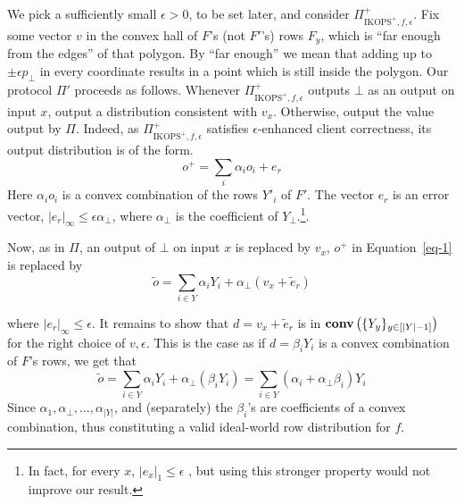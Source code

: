 \documentclass{llncs}
\newcommand{\CH}[1]{\normalfont{\mathbf{conv}\of{#1}}}
\begin{document}
{We pick a sufficiently small $\epsilon>0$, to be set later, and consider $\Pi^+_{\text{IKOPS}^+,f,\epsilon}$. Fix some vector $v$ in the convex hall of $F$'s (not $F'$'s) rows $F_y$, which is ``far enough from the edges'' of that polygon.
By ``far enough'' we mean that adding up to $\pm\epsilon p_\bot$ in every coordinate
results in a point which is still inside the polygon.
Our protocol $\Pi'$ proceeds as follows. Whenever $\Pi^+_{\text{IKOPS}^+,f,\epsilon}$ outputs $\bot$ as an output on input $x$, output  a distribution consistent with $v_x$. Otherwise, output the value output by $\Pi$. 
Indeed, as $\Pi^+_{\text{IKOPS}^+,f,\epsilon}$ satisfies $\epsilon$-enhanced client correctness, its output distribution 
is of the form.
\begin{equation}\label{eq-1}
o^+ = \sum_i\alpha_i o_i + e_r
\end{equation}
Here $\alpha_i o_i$ is a convex combination of the rows $Y'_i$ of $F'$.
The vector $e_r$ is an error vector, $|e_r|_\infty\leq \epsilon\alpha_\bot$, where $\alpha_\bot$ is the coefficient of $Y_\bot$.\footnote{In fact, for every $x$, $|e_x|_1\leq \epsilon$ , but using this stronger property would not improve our result.}.

Now, as in $\Pi$, an output of $\bot$ on input $x$ is replaced by $v_x$,
$o^+$ in Equation~\ref{eq-1} is replaced by
\begin{equation}
\tilde{o} = \sum_{i\in Y}\alpha_i Y_i + \alpha_\bot (v_x+\tilde{e}_r)
\end{equation}

where $|e_r|_\infty\leq \epsilon$.
It remains to show that $d = v_x + \tilde{e}_r$ is in $\CH{\{Y_y\}_{y\in [|Y|-1]}}$ for the right choice of $v,\epsilon$. This is the case as if $d = \beta_i Y_i$ is a convex combination of $F$'s rows, we get that
\[\tilde{o} = \sum_{i\in Y}\alpha_i Y_i + \alpha_\bot (\beta_i Y_i)=\sum_{i\in Y}(\alpha_i +\alpha_\bot\beta_i)Y_i\]
Since $\alpha_1,\alpha_\bot,\ldots,\alpha_{|Y|}$, and (separately) the $\beta_i$'s are coefficients of a convex combination, thus constituting a valid ideal-world row distribution for $f$.


}
\end{document}
